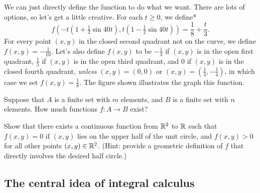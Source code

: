 \documentclass{watsonbook}
\begin{document}
\begin{solution}
  \begin{minipage}[t]{0.65\textwidth}
    We can just directly define the function to do what we want. There
    are lots of options, so let's get a little creative. For each
    $t \geq 0$, we define* 
    \[
      f\left(-t\left(1+\tfrac{1}{2}\sin
    40t\right),t\left(1-\tfrac{1}{2}\sin 40t\right)\right) =
     \frac{1}{8} + \frac{t}{3}. 
   \]
   For every point $(x,y)$ in the closed second quadrant not on the
   curve, we define $f(x,y) = -\tfrac{1}{10}$. Let's also define
   $f(x,y)$ to be $-\tfrac{1}{3}$ if $(x,y)$ is in the open first
   quadrant, $\tfrac{1}{5}$ if $(x,y)$ is in the open third quadrant,
   and 0 if $(x,y)$ is in the closed fourth quadrant, \textit{unless}
   $(x,y) = (0,0)$ or
   $(x,y) = \left(\tfrac{1}{4}, -\tfrac{1}{4}\right)$, in which case
   we set $f(x,y) = \frac{1}{8}$. The figure shown illustrates the
   graph this function.
  \end{minipage} \hfill
  \begin{minipage}[t]{0.34\textwidth}
    \centering 
    \raisebox{\dimexpr -\height + 1.5 ex \relax}{
      \usebox{\asybox}}
\end{minipage}
\end{solution}

\begin{exercise}{}{}
  Suppose that $A$ is a finite set with $m$ elements, and $B$ is a
  finite set with $n$ elements. How much functions $f:A \to B$ exist?  
\end{exercise}

\begin{exercise}{}{}
  Show that there exists a continuous function from $\mathbb{R}^2$ to $\mathbb{R}$
  such that $f(x,y) = 0$ if $(x,y)$ lies on the upper half of the unit
  circle, and $f(x,y) > 0$ for all other points $(x,y) \in
  \mathbb{R}^2$. (Hint: provide a geometric definition of $f$ that directly
  involves the desired half circle.)
\end{exercise}

\newpage 

\subsection{The central idea of integral calculus} \label{sec:centralidea}
  
\end{document}
